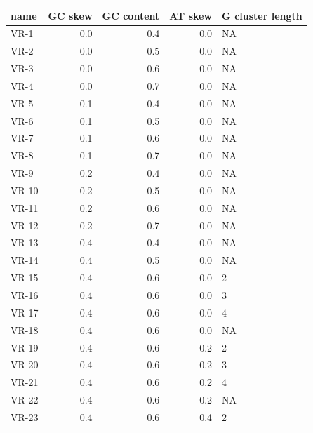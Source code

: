 \documentclass[11pt]{article}
\begin{document}
\begin{table}
	\centering
\begin{tabular}{lrrrl}
	\toprule
	name &  GC skew &  GC content &  AT skew & G cluster length \\
	\midrule
	VR-1 &      0.0 &         0.4 &      0.0 &             NA \\
	VR-2 &      0.0 &         0.5 &      0.0 &             NA \\
	VR-3 &      0.0 &         0.6 &      0.0 &             NA \\
	VR-4 &      0.0 &         0.7 &      0.0 &             NA \\
	VR-5 &      0.1 &         0.4 &      0.0 &             NA \\
	VR-6 &      0.1 &         0.5 &      0.0 &             NA \\
	VR-7 &      0.1 &         0.6 &      0.0 &             NA \\
	VR-8 &      0.1 &         0.7 &      0.0 &             NA \\
	VR-9 &      0.2 &         0.4 &      0.0 &             NA \\
	VR-10 &      0.2 &         0.5 &      0.0 &             NA \\
	VR-11 &      0.2 &         0.6 &      0.0 &             NA \\
	VR-12 &      0.2 &         0.7 &      0.0 &             NA \\
	VR-13 &      0.4 &         0.4 &      0.0 &             NA \\
	VR-14 &      0.4 &         0.5 &      0.0 &             NA \\
	VR-15 &      0.4 &         0.6 &      0.0 &              2 \\
	VR-16 &      0.4 &         0.6 &      0.0 &              3 \\
	VR-17 &      0.4 &         0.6 &      0.0 &              4 \\
	VR-18 &      0.4 &         0.6 &      0.0 &             NA \\
	VR-19 &      0.4 &         0.6 &      0.2 &              2 \\
	VR-20 &      0.4 &         0.6 &      0.2 &              3 \\
	VR-21 &      0.4 &         0.6 &      0.2 &              4 \\
	VR-22 &      0.4 &         0.6 &      0.2 &             NA \\
	VR-23 &      0.4 &         0.6 &      0.4 &              2 \\

\end{tabular}
\end{table}
\end{document}
